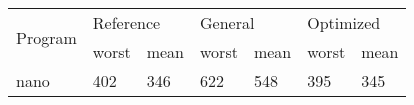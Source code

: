 

\begin{table}[]
\centering
\begin{tabular}{@{}lllllll@{}}
\toprule
\multicolumn{1}{l|}{\multirow{2}{*}{Program}} & \multicolumn{2}{l|}{Reference}                         & \multicolumn{2}{l|}{General}                           & \multicolumn{2}{l}{Optimized}     \\ \cmidrule(l){2-7} 
\multicolumn{1}{l|}{}                         & \multicolumn{1}{l|}{worst} & \multicolumn{1}{l|}{mean} & \multicolumn{1}{l|}{worst} & \multicolumn{1}{l|}{mean} & \multicolumn{1}{l|}{worst} & mean \\ \midrule
nano                                          & 402                        & 346                       & 622                        & 548                       & 395                        & 345  \\ \bottomrule
\end{tabular}
\end{table}

